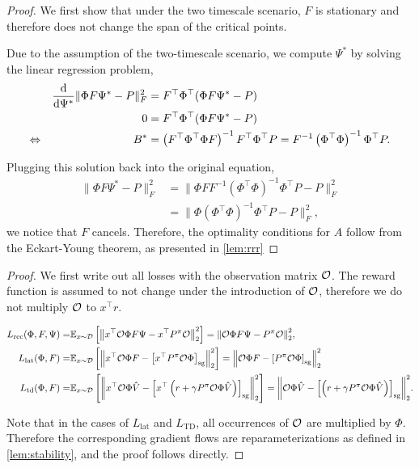 \ReconstructionStationaryPoints*


\begin{proof}
We first show that under the two timescale scenario, $F$ is stationary and therefore does not change the span of the critical points.

Due to the assumption of the two-timescale scenario, we compute $\Psi^*$ by solving the linear regression problem,
\begin{align*}
    &&\frac{\mathrm{d}}{\mathrm{d} \Psi^*} \lVert \Phi F\Psi^* - P \rVert_F^2 &= F^\top {\Phi}^\top ({\Phi}F\Psi^* - P)\\
    &&0 &=  F^\top {\Phi}^\top ({\Phi}F\Psi^* - P)\\
    \Leftrightarrow && B^* &= \left(F^\top {\Phi}^\top {\Phi}F\right)^{-1} F^\top \Phi^\top P = F^{-1}\left(\Phi^\top \Phi\right)^{-1} \Phi^\top P.
\end{align*}

Plugging this solution back into the original equation, 
\begin{align}
    \lVert \Phi F\Psi^* - P \rVert_F^2 &= \lVert \Phi FF^{-1}\left(\Phi^\top \Phi\right)^{-1} \Phi^\top P - P \rVert_F^2\\
    &= \lVert \Phi \left(\Phi^\top \Phi\right)^{-1} \Phi^\top P - P \rVert_F^2,
\end{align}
we notice that $F$ cancels.
Therefore, the optimality conditions for $A$ follow from the Eckart-Young theorem, as presented in \autoref{lem:rrr}
\end{proof}

\ReparameterizationInvariance*

\begin{proof}
We first write out all losses with the observation matrix ${\mathcal{O}}$. The reward function is assumed to not change under the introduction of ${\mathcal{O}}$, therefore we do not multiply ${\mathcal{O}}$ to $x^\top r$.

\begin{align*}
    L_{\text{rec}}(\Phi,F,\Psi) =& \mathbb{E}_{x \sim \mathcal{D}}\left[  \left\lVert x^\top {\mathcal{O}} \Phi F \Psi - x^\top {P^\pi}{\mathcal{O}} \right\rVert_2^2 \right] = {\left\lVert {\mathcal{O}} \Phi F \Psi - {P^\pi}{\mathcal{O}} \right\rVert_2^2}, \\
    L_{\text{lat}}(\Phi,F) =& \mathbb{E}_{x \sim \mathcal{D}}\left[  \left\lVert x^\top {\mathcal{O}} \Phi F - \left[x^\top {P^\pi} {\mathcal{O}} \Phi\right]_{\mathrm{sg}} \right\rVert_2^2 \right] = \left\lVert {\mathcal{O}} \Phi F - \left[{P^\pi} {\mathcal{O}} \Phi\right]_{\mathrm{sg}} \right\rVert_2^2 \\
    L_{\text{td}}(\Phi,F) =& \mathbb{E}_{x \sim \mathcal{D}}\left[  \left\lVert x^\top{\mathcal{O}}\Phi \hat{V} - \left[x^\top \left(r + \gamma P^\pi {\mathcal{O}}\Phi \hat{V}\right)\right]_{\mathrm{sg}} \right\rVert_2^2 \right] = {\left\lVert {\mathcal{O}}\Phi \hat{V} - \left[\left(r + \gamma P^\pi {\mathcal{O}}\Phi \hat{V}\right)\right]_{\mathrm{sg}} \right\rVert_2^2}.
\end{align*}

Note that in the cases of $L_{\text{lat}}$ and $L_\text{TD}$, all occurrences of ${\mathcal{O}}$ are multiplied by $\Phi$.
Therefore the corresponding gradient flows are reparameterizations as defined in \autoref{lem:stability}, and the proof follows directly.
\end{proof}

